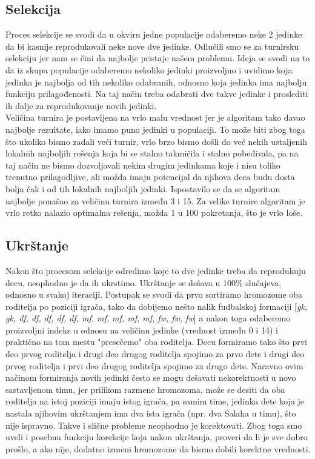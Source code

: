 \documentclass[a4paper]{article}
\begin{document}
\subsection{Selekcija}
Proces selekcije se svodi da u okviru jedne populacije odaberemo neke 2 jedinke da bi kasnije reprodukovali neke nove dve jedinke. Odlučili smo se za turnirsku selekciju jer nam se čini da najbolje pristaje našem problemu. Ideja se svodi na to da iz skupa populacije odaberemo nekoliko jedinki proizvoljno i uvidimo koja jedinka je najbolja od tih nekoliko odabranih, odnosno koja jedinka ima najbolju funkciju prilagođenosti. Na taj način treba odabrati dve takve jedinke i proslediti ih dalje za reprodukovanje novih jedinki. \\
Veličina turnira je postavljena na vrlo malu vrednost jer je algoritam tako davao najbolje rezultate, iako imamo puno jedinki u populaciji. To može biti zbog toga što ukoliko bismo zadali veći turnir, vrlo brzo bismo došli do već nekih ustaljenih lokalnih najboljih rešenja koja bi se stalno takmičila i stalno pobeđivala, pa na taj način ne bismo dozvoljavali nekim drugim jedinkama koje i nisu toliko trenutno prilagodljive, ali možda imaju potencijal da njihova deca budu dosta bolja čak i od tih lokalnih najboljih jedinki. Ispostavilo se da se algoritam najbolje ponašao za veličinu turnira između 3 i 15. Za velike turnire algoritam je vrlo retko nalazio optimalna rešenja, možda 1 u 100 pokretanja, što je vrlo loše.

\subsection{Ukrštanje}
Nakon što procesom selekcije odredimo koje to dve jedinke treba da reprodukuju decu, neophodno je da ih ukrstimo. Ukrštanje se dešava u 100\% slučajeva, odnosno u svakoj iteraciji. Postupak se svodi da prvo sortiramo hromozome oba roditelja po poziciji igrača, tako da dobijemo nešto nalik fudbalskoj formaciji [\textit{gk, gk, df, df, df, df, df, mf, mf, mf, mf, mf, fw, fw, fw}] a nakon toga odaberemo proizvoljni indeks u odnosu na veličinu jedinke (vrednost između 0 i 14) i praktično na tom mestu "presečemo" oba roditelja. Decu formiramo tako što prvi deo prvog roditelja i drugi deo drugog roditelja spojimo za prvo dete i drugi deo prvog roditelja i prvi deo drugog roditelja spojimo za drugo dete. Naravno ovim načinom formiranja novih jedinki često se mogu dešavati nekorektnosti u novo sastavljenom timu, jer prilikom razmene hromozoma, može se desiti da oba roditelja na istoj poziciji imaju istog igrača, pa samim time, jedinka dete koja je nastala njihovim ukrštanjem ima dva ista igrača (npr. dva Salaha u timu), što nije ispravno. Takve i slične probleme neophodno je korektovati. Zbog toga smo uveli i posebnu funkciju korekcije koja nakon ukrštanja, proveri da li je sve dobro prošlo, a ako nije, dodatno izmeni hromozome da bismo dobili korektne vrednosti.
\end{document}
